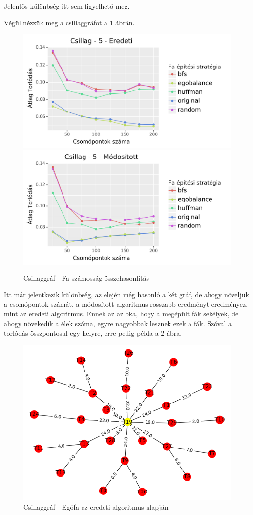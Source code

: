 \documentclass[12pt]{report}
\begin{document}
Jelentős különbség itt sem figyelhető meg.

Végül nézzük meg a csillaggráfot a \ref{star-tree-difference-con} ábrán. 

\begin{figure}[H]
	\begin{center}
		\includegraphics[width=0.49\linewidth]{pictures/star_con_e.png}
		\includegraphics[width=0.49\linewidth]{pictures/star_con_m.png}
		\caption{Csillaggráf - Fa számosság összehasonlítás}
		\label{star-tree-difference-con}
	\end{center}
\end{figure}

Itt már jelentkezik különbség, az elején még hasonló a két gráf, de ahogy növeljük a csomópontok számát, a módosított algoritmus rosszabb eredményt eredményez, mint az eredeti algoritmus.
Ennek az az oka, hogy a megépült fák sekélyek, de ahogy növekedik a élek száma, egyre nagyobbak lesznek ezek a fák.
Szóval a torlódás összpontosul egy helyre, erre pedig példa a \ref{inbalance} ábra.

\begin{figure}[H]
	\begin{center}
		\includegraphics[width=0.7\linewidth]{pictures/Figure_5.png}
		\caption{Csillaggráf - Egófa az eredeti algoritmus alapján}
		\label{inbalance}
	\end{center}
\end{figure}
\end{document}
